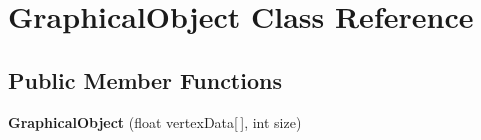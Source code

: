 \hypertarget{classGraphicalObject}{
\section{GraphicalObject Class Reference}
\label{classGraphicalObject}
}
\subsection*{Public Member Functions}
\begin{DoxyCompactItemize}
\item 
\hypertarget{classGraphicalObject_ae30831806efa43bde19640c8857559ce}{
{\bfseries GraphicalObject} (float vertexData\mbox{[}$\,$\mbox{]}, int size)}
\label{classGraphicalObject_ae30831806efa43bde19640c8857559ce}


\end{DoxyCompactItemize}

